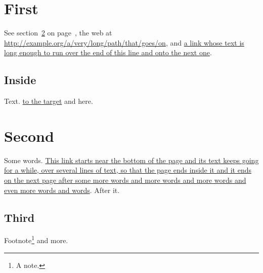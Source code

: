 \documentclass{article}
\begin{document}
\section{First}\label{sec:first}
See section~\ref{sec:second} on page~\pageref{sec:second}, the web at
\url{http://example.org/a/very/long/path/that/goes/on}, and
\href{http://example.org}{a link whose text is long enough to run over the
end of this line and onto the next one}.
\subsection{Inside}
Text. \hyperlink{target}{to the target} and \hypertarget{target}{here}.
\section{Second}\label{sec:second}
Some words. \href{http://example.org/page}{This link starts near the
bottom of the page and its text keeps going for a while, over several
lines of text, so that the page ends inside it and it ends on the next
page after some more words and more words and more words and even more
words and words}. After it.
\subsection{Third}
Footnote\footnote{A note.} and more.
\end{document}
